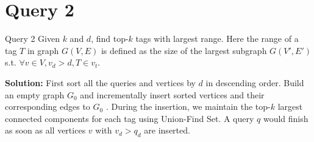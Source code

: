 

\section{Query 2}
\begin{frame}{Query 2}
Given $k$ and $d$, find top-$k$ tags with largest range. Here the
range of a tag $T$ in graph $G(V, E)$ is defined as the size of the
largest subgraph $G(V', E')$ s.t. $\forall v \in V ,v_d > d,  T \in v_t $.

\textbf{Solution:} First sort all the queries and vertices by $d$ in descending order.
Build an empty graph $G_0$ and incrementally insert sorted
vertices and their corresponding edges to $G_0$ .
  During the insertion, we maintain the top-$k$ largest connected
components for each tag using Union-Find Set. A query $q$ would
finish as soon as all vertices $v$ with $v_d>q_d$ are inserted.
\end{frame}
